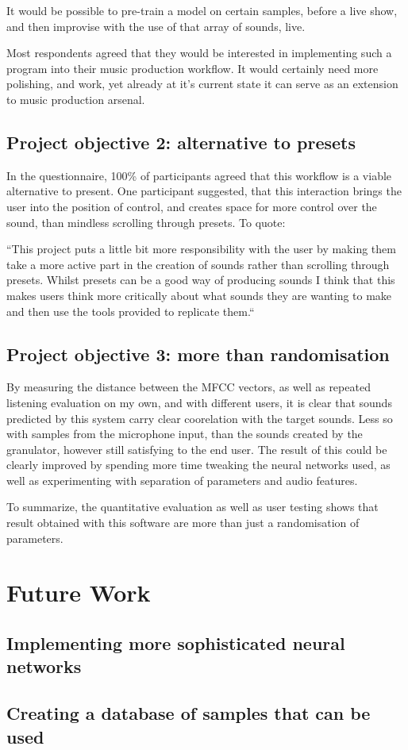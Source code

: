 It would be possible to pre-train a model on certain samples, before a
live show, and then improvise with the use of that array of sounds,
live.

Most respondents agreed that they would be interested in implementing
such a program into their music production workflow. It would
certainly need more polishing, and work, yet already at it's current
state it can serve as an extension to music production arsenal.

\subsection{Project objective 2: alternative to presets}

In the questionnaire, 100\% of participants agreed that this workflow
is a viable alternative to present. One participant suggested, that
this interaction brings the user into the position of control, and
creates space for more control over the sound, than mindless scrolling
through presets. To quote:

``This project puts a little bit more responsibility with the user by
making them take a more active part in the creation of sounds rather
than scrolling through presets. Whilst presets can be a good way of
producing sounds I think that this makes users think more critically
about what sounds they are wanting to make and then use the tools
provided to replicate them.``

\subsection{Project objective 3: more than randomisation}

By measuring the distance between the MFCC vectors, as well as
repeated listening evaluation on my own, and with different users, it
is clear that sounds predicted by this system carry clear coorelation
with the target sounds. Less so with samples from the microphone
input, than the sounds created by the granulator, however still
satisfying to the end user. The result of this could be clearly
improved by spending more time tweaking the neural networks used, as
well as experimenting with separation of parameters and audio
features.

To summarize, the quantitative evaluation as well as user testing
shows that result obtained with this software are more than just a
randomisation of parameters.

\section{Future Work}

\subsection{Implementing more sophisticated neural networks}

\subsection{Creating a database of samples that can be used}

